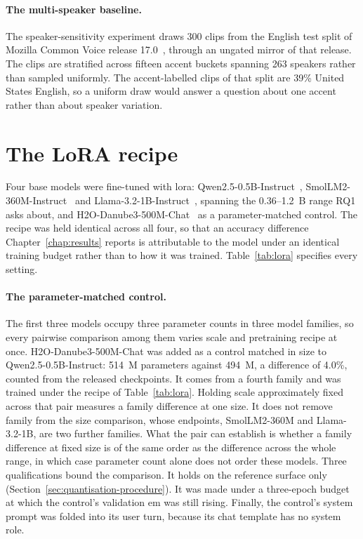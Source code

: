 \paragraph{The multi-speaker baseline.}  The speaker-sensitivity experiment draws 300 clips from the
English test split of Mozilla Common Voice release 17.0~\cite{commonvoice,commonvoice17}, through an
ungated mirror of that release. The clips are stratified across fifteen accent buckets spanning 263
speakers rather than sampled uniformly. The accent-labelled clips of that split are 39\% United
States English, so a uniform draw would answer a question about one accent rather than about
speaker variation.

\section{The LoRA recipe}
\label{sec:lora}
Four base models were fine-tuned with \gls{lora}: Qwen2.5-0.5B-Instruct~\cite{qwen25},
SmolLM2-360M-Instruct~\cite{smollm2} and Llama-3.2-1B-Instruct~\cite{llama32}, spanning the
0.36--1.2~B range RQ1 asks about, and H2O-Danube3-500M-Chat~\cite{danube3} as a parameter-matched
control. The recipe was held identical across all four, so that an accuracy difference
Chapter~\ref{chap:results} reports is attributable to the model under an identical training budget
rather than to how it was trained. Table~\ref{tab:lora} specifies every setting.

\paragraph{The parameter-matched control.} The first three models occupy three parameter counts in
three model families, so every pairwise comparison among them varies scale and pretraining recipe at
once. H2O-Danube3-500M-Chat was added as a control matched in size to Qwen2.5-0.5B-Instruct: 514~M
parameters against 494~M, a difference of 4.0\%, counted from the released checkpoints. It comes
from a fourth family and was trained under the recipe of Table~\ref{tab:lora}. Holding scale
approximately fixed across that pair measures a family difference at one size. It does not remove
family from the size comparison, whose endpoints, SmolLM2-360M and Llama-3.2-1B, are two further
families. What the pair can establish is whether a family difference at fixed size is of the same
order as the difference across the whole range, in which case parameter count alone does not order
these models. Three qualifications bound the comparison. It holds on the reference surface only
(Section~\ref{sec:quantisation-procedure}). It was made under a three-epoch budget at which the
control's validation \gls{em} was still rising. Finally, the control's system prompt was folded into its
user turn, because its chat template has no system role.

